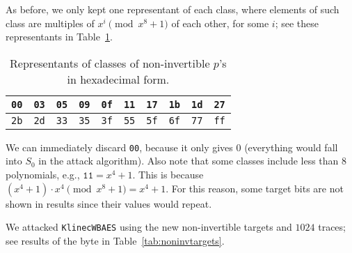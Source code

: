 As before, we only kept one representant of each class, where elements of such class are multiples of $x^i\pmod{x^8+1}$ of each other, for some $i$; see these representants in Table~\ref{tab:classreprenoninv}.

\begin{table}[H]
	\begin{center}
	\begin{tabular}{| c | c | c | c | c | c | c | c | c | c |}
		\hline
		{\tt 00} & {\tt 03} & {\tt 05} & {\tt 09} & {\tt 0f} & {\tt 11} & {\tt 17} & {\tt 1b} & {\tt 1d} & {\tt 27} \\
		\hline
		{\tt 2b} & {\tt 2d} & {\tt 33} & {\tt 35} & {\tt 3f} & {\tt 55} & {\tt 5f} & {\tt 6f} & {\tt 77} & {\tt ff} \\
		\hline
	\end{tabular}
	\end{center}
\caption{Representants of classes of non-invertible $p$'s in hexadecimal form.}
\label{tab:classreprenoninv}
\end{table}

We can immediately discard {\tt 00}, because it only gives $0$ (everything would fall into $S_0$ in the attack algorithm). Also note that some classes include less than $8$ polynomials, e.g., $\texttt{11} = x^4+1$. This is because $(x^4+1)\cdot x^4 \pmod{x^8+1} = x^4+1$. For this reason, some target bits are not shown in results since their values would repeat.

We attacked {\tt KlinecWBAES} using the new non-invertible targets and $1024$ traces; see results of the  byte in Table~\ref{tab:noninvtargets}.




